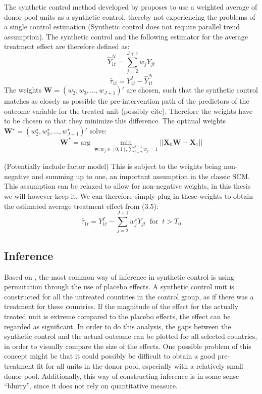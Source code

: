 \documentclass{scrbook}
\begin{document}
The synthetic control method developed by
\textcite{abadie_economic_2003} proposes to use a weighted average of
donor pool units as a synthetic control, thereby not experiencing the
problems of a single control estimation (Synthetic control does not
require parallel trend assumption). The synthetic control and the
following estimator for the average treatment effect are therefore
defined as: \begin{equation}
\hat{Y}_{1t}^{N}=\sum_{j=2}^{J+1} w_{j}Y_{jt}
\end{equation} \begin{equation}
\hat{\tau}_{1t}=Y_{1t}^{I}-\hat{Y}_{1t}^{N}
\end{equation} The weights \(\mathbf{W}=(w_{2},w_{3},...,w_{J+1})'\) are
chosen, such that the synthetic control matches as closely as possible
the pre-intervention path of the predictors of the outcome variable for
the treated unit (possibly cite). Therefore the weights have to be
chosen so that they minimize this difference. The optimal weights
\(\mathbf{W}^{\star}=(w_{2}^{\star},w_{3}^{\star},...,w_{J+1}^{\star})'\)
solve: \begin{equation}
\mathbf{W}^{*}=\text{arg}\; \min_{\mathbf{w}:w_{j}\in[0,1],\sum_{j=2}^{J+1} w_{j}=1}\vert\vert\mathbf{X}_{0}\mathbf{W}-\mathbf{X}_{1}\vert\vert
\end{equation}

(Potentially include factor model) This is subject to the weights being
non-negative and summing up to one, an important assumption in the
classic SCM. This assumption can be relaxed to allow for non-negative
weights, in this thesis we will however keep it. We can therefore simply
plug in these weights to obtain the estimated average treatment effect
from (3.5): \begin{equation}
\hat{\tau}_{1t}=Y_{1t}^{I}-\sum_{j=2}^{J+1} w_{j}^{\star}Y_{jt}\; \; \text{for}\; \; t>T_{0}
\end{equation}

\subsection*{Inference}

Based on \textcite{abadie_synthetic_2010}, the most common way of
inference in synthetic control is using permutation through the use of
placebo effects. A synthetic control unit is constructed for all the
untreated countries in the control group, as if there was a treatment
for these countries. If the magnitude of the effect for the actually
treated unit is extreme compared to the placebo effects, the effect can
be regarded as significant. In order to do this analysis, the gaps
between the synthetic control and the actual outcome can be plotted for
all selected countries, in order to visually compare the size of the
effects. One possible problem of this concept might be that it could
possibly be difficult to obtain a good pre-treatment fit for all units
in the donor pool, especially with a relatively small donor pool.
Additionally, this way of constructing inference is in some sense
``blurry'', since it does not rely on quantitative measure.
\end{document}

